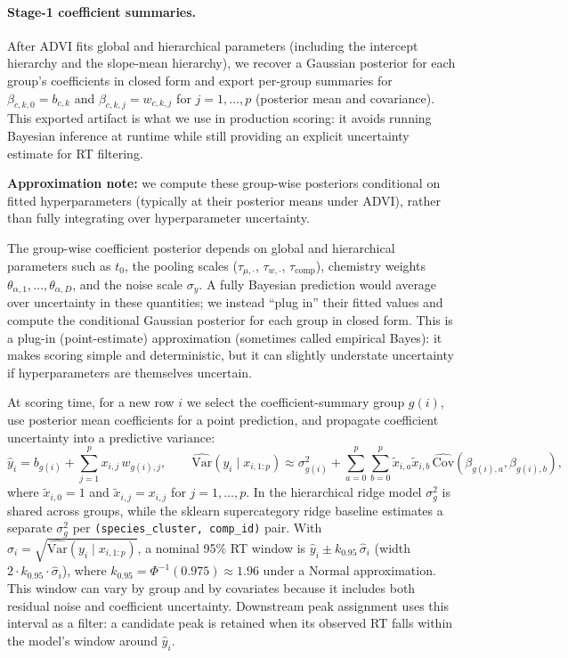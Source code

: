 \documentclass[11pt]{article}
\begin{document}
\paragraph{Stage-1 coefficient summaries.}
After ADVI fits global and hierarchical parameters (including the intercept hierarchy and the slope-mean hierarchy), we
recover a Gaussian posterior for each group’s coefficients in closed form and export per-group summaries for
$\beta_{c,k,0}=b_{c,k}$ and $\beta_{c,k,j}=w_{c,k,j}$ for $j=1,\ldots,p$ (posterior mean and covariance). This exported
artifact is what we use in production scoring: it avoids running Bayesian inference at runtime while still providing an
explicit uncertainty estimate for RT filtering.

\textbf{Approximation note:} we compute these group-wise posteriors conditional on fitted hyperparameters (typically at
their posterior means under ADVI), rather than fully integrating over hyperparameter uncertainty.

The group-wise coefficient posterior depends on global and hierarchical parameters such as $t_0$, the pooling scales
($\tau_{\mu,\cdot}$, $\tau_{w,\cdot}$, $\tau_{\mathrm{comp}}$), chemistry weights $\theta_{\alpha,1},\ldots,\theta_{\alpha,D}$,
and the noise scale $\sigma_y$. A fully Bayesian prediction would average over uncertainty in these quantities; we instead
``plug in'' their fitted values and compute the conditional Gaussian posterior for each group in closed form. This is a
plug-in (point-estimate) approximation (sometimes called empirical Bayes): it makes scoring simple and deterministic,
but it can slightly understate uncertainty if hyperparameters are themselves uncertain.

At scoring time, for a new row $i$ we select the coefficient-summary group $g(i)$, use posterior mean coefficients for a
point prediction, and propagate coefficient uncertainty into a predictive variance:
\[
  \hat{y}_i = b_{g(i)} + \sum_{j=1}^{p} x_{i,j}\,w_{g(i),j}, \qquad
  \widehat{\mathrm{Var}}(y_i\mid x_{i,1:p}) \approx \sigma^2_{g(i)} + \sum_{a=0}^{p}\sum_{b=0}^{p}
  \tilde{x}_{i,a}\tilde{x}_{i,b}\,\widehat{\mathrm{Cov}}(\beta_{g(i),a},\beta_{g(i),b}),
\]
where $\tilde{x}_{i,0}=1$ and $\tilde{x}_{i,j}=x_{i,j}$ for $j=1,\ldots,p$.
In the hierarchical ridge model $\sigma^2_{g}$ is shared across groups, while the sklearn supercategory ridge baseline
estimates a separate $\sigma^2_{g}$ per \texttt{(species\_cluster, comp\_id)} pair.
With $\hat{\sigma}_i=\sqrt{\widehat{\mathrm{Var}}(y_i\mid x_{i,1:p})}$, a nominal 95\% RT window is
$\hat{y}_i \pm k_{0.95}\,\hat{\sigma}_i$ (width $2\cdot k_{0.95}\cdot \hat{\sigma}_i$), where
$k_{0.95}=\Phi^{-1}(0.975)\approx 1.96$ under a Normal approximation. This window can vary by group and by
covariates because it includes both residual noise and coefficient uncertainty.
Downstream peak assignment uses this interval as a filter: a candidate peak is retained when its observed RT falls within
the model’s window around $\hat{y}_i$.
\end{document}

